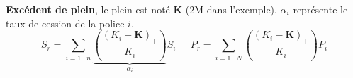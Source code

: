 \begin{f}
\textbf{Excédent de plein}, le plein est noté $\boldsymbol{K}$ (2M\EUR{} dans l'exemple), $\alpha_i$ représente le taux de cession de la police $i$.
	$$
	S_r= \sum_{i=1\ldots n}\underbrace{\left(\frac{\left(K_i-\boldsymbol{K} \right)_+ }{K_i} \right)}_{\alpha_i} S_i\quad \ \ P_r=\sum_{i=1\ldots N}\left(\frac{\left(K_i-\boldsymbol{K} \right)_+ }{K_i} \right)P_i 
	$$



\end{f}
